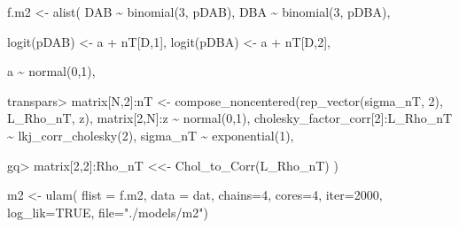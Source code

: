 \documentclass[
]{article}
\newenvironment{Shaded}{\begin{snugshade}}{\end{snugshade}}
\newcommand{\AttributeTok}[1]{\textcolor[rgb]{0.77,0.63,0.00}{#1}}
\newcommand{\ConstantTok}[1]{\textcolor[rgb]{0.00,0.00,0.00}{#1}}
\newcommand{\DecValTok}[1]{\textcolor[rgb]{0.00,0.00,0.81}{#1}}
\newcommand{\FunctionTok}[1]{\textcolor[rgb]{0.00,0.00,0.00}{#1}}
\newcommand{\NormalTok}[1]{#1}
\newcommand{\OtherTok}[1]{\textcolor[rgb]{0.56,0.35,0.01}{#1}}
\newcommand{\SpecialCharTok}[1]{\textcolor[rgb]{0.00,0.00,0.00}{#1}}
\newcommand{\StringTok}[1]{\textcolor[rgb]{0.31,0.60,0.02}{#1}}
\begin{document}
\begin{Shaded}
\begin{Highlighting}[]
\NormalTok{f.m2 }\OtherTok{\textless{}{-}} \FunctionTok{alist}\NormalTok{(}
\NormalTok{    DAB }\SpecialCharTok{\textasciitilde{}} \FunctionTok{binomial}\NormalTok{(}\DecValTok{3}\NormalTok{, pDAB),}
\NormalTok{    DBA }\SpecialCharTok{\textasciitilde{}} \FunctionTok{binomial}\NormalTok{(}\DecValTok{3}\NormalTok{, pDBA),}

    \FunctionTok{logit}\NormalTok{(pDAB) }\OtherTok{\textless{}{-}}\NormalTok{ a }\SpecialCharTok{+}\NormalTok{ nT[D,}\DecValTok{1}\NormalTok{],}
    \FunctionTok{logit}\NormalTok{(pDBA) }\OtherTok{\textless{}{-}}\NormalTok{ a }\SpecialCharTok{+}\NormalTok{ nT[D,}\DecValTok{2}\NormalTok{],}

\NormalTok{    a }\SpecialCharTok{\textasciitilde{}} \FunctionTok{normal}\NormalTok{(}\DecValTok{0}\NormalTok{,}\DecValTok{1}\NormalTok{),}

\NormalTok{    transpars}\SpecialCharTok{\textgreater{}}\NormalTok{ matrix[N,}\DecValTok{2}\NormalTok{]}\SpecialCharTok{:}\NormalTok{nT }\OtherTok{\textless{}{-}} 
        \FunctionTok{compose\_noncentered}\NormalTok{(}\FunctionTok{rep\_vector}\NormalTok{(sigma\_nT, }\DecValTok{2}\NormalTok{), L\_Rho\_nT, z),}
\NormalTok{    matrix[}\DecValTok{2}\NormalTok{,N]}\SpecialCharTok{:}\NormalTok{z }\SpecialCharTok{\textasciitilde{}} \FunctionTok{normal}\NormalTok{(}\DecValTok{0}\NormalTok{,}\DecValTok{1}\NormalTok{),}
\NormalTok{    cholesky\_factor\_corr[}\DecValTok{2}\NormalTok{]}\SpecialCharTok{:}\NormalTok{L\_Rho\_nT }\SpecialCharTok{\textasciitilde{}} \FunctionTok{lkj\_corr\_cholesky}\NormalTok{(}\DecValTok{2}\NormalTok{),}
\NormalTok{    sigma\_nT }\SpecialCharTok{\textasciitilde{}} \FunctionTok{exponential}\NormalTok{(}\DecValTok{1}\NormalTok{),}

\NormalTok{    gq}\SpecialCharTok{\textgreater{}}\NormalTok{ matrix[}\DecValTok{2}\NormalTok{,}\DecValTok{2}\NormalTok{]}\SpecialCharTok{:}\NormalTok{Rho\_nT }\OtherTok{\textless{}\textless{}{-}} \FunctionTok{Chol\_to\_Corr}\NormalTok{(L\_Rho\_nT)}
\NormalTok{)}

\NormalTok{m2 }\OtherTok{\textless{}{-}} \FunctionTok{ulam}\NormalTok{(}
    \AttributeTok{flist =}\NormalTok{ f.m2,}
    \AttributeTok{data =}\NormalTok{ dat,}
    \AttributeTok{chains=}\DecValTok{4}\NormalTok{,}
    \AttributeTok{cores=}\DecValTok{4}\NormalTok{,}
    \AttributeTok{iter=}\DecValTok{2000}\NormalTok{,}
    \AttributeTok{log\_lik=}\ConstantTok{TRUE}\NormalTok{,}
    \AttributeTok{file=}\StringTok{"./models/m2"}\NormalTok{)}
\end{Highlighting}
\end{Shaded}
\end{document}
